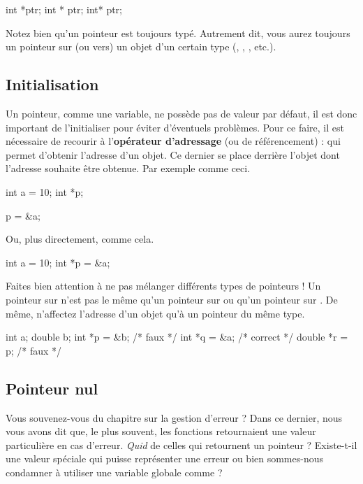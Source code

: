\begin{C}
int *ptr;
int * ptr;
int* ptr;
\end{C}

\begin{attentionbox}
Notez bien qu'un pointeur est toujours typé. Autrement dit, vous aurez
toujours un pointeur sur (ou vers) un objet d'un certain type (,
, , etc.).
\end{attentionbox}

\subsection{Initialisation}
\label{initialisation-2}

Un pointeur, comme une variable, ne possède pas de valeur par défaut, il
est donc important de l'initialiser pour éviter d'éventuels problèmes.
Pour ce faire, il est nécessaire de recourir à l'\textbf{opérateur
d'adressage} (ou de référencement) : \mybox{\&} qui permet d'obtenir
l'adresse d'un objet. Ce dernier se place derrière l'objet dont
l'adresse souhaite être obtenue. Par exemple comme ceci.

\begin{C}
int a = 10;
int *p;

p = &a;
\end{C}

Ou, plus directement, comme cela.

\begin{C}
int a = 10;
int *p = &a;
\end{C}

\begin{erreurbox}
Faites bien attention à ne pas mélanger différents types de pointeurs !
Un pointeur sur  n'est pas le même qu'un pointeur sur 
ou qu'un pointeur sur . De même, n'affectez l'adresse d'un
objet qu'à un pointeur du même type.
\begin{C}
 int a;
double b;
int *p = &b; /* faux */
int *q = &a; /* correct */
double *r = p; /* faux */
\end{C}
\end{erreurbox}

\subsection{Pointeur nul}
\label{pointeur-nul}

Vous souvenez-vous du chapitre sur la gestion d'erreur ? Dans ce
dernier, nous vous avons dit que, le plus souvent, les fonctions
retournaient une valeur particulière en cas d'erreur. \emph{Quid} de
celles qui retournent un pointeur ? Existe-t-il une valeur spéciale qui
puisse représenter une erreur ou bien sommes-nous condamner à utiliser
une variable globale comme  ?

